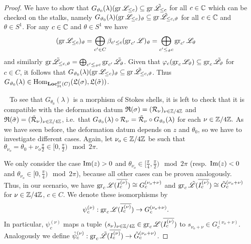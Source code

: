 \begin{proof}
    We have to show that $G_{\vartheta_0}(\lambda)(\operatorname{gr}\mathscr{L}_{\leq c}) \subseteq \operatorname{gr}\tilde{\mathscr{L}}_{\leq c}$ for all $c \in \mathbb{C}$ which can be checked on the stalks, namely $G_{\vartheta_0}(\lambda)(\operatorname{gr}\mathscr{L}_{\leq c})_\vartheta \subseteq \operatorname{gr}\tilde{\mathscr{L}}_{\leq c,\vartheta}$ for all $c \in \mathbb{C}$ and $\theta \in S^1$. For any $c \in \mathbb{C}$ and $\theta \in S^1$ we have
    \[
    (\operatorname{gr}\mathscr{L}_{\leq c})_\vartheta = \bigoplus_{c' \in C} \beta_{c' \leq c}(\operatorname{gr}_{c'}\mathscr{L})_\vartheta = \bigoplus_{c' \leq_\vartheta c} \operatorname{gr}_{c'}\mathscr{L}_\vartheta
    \]
    and similarly $\operatorname{gr}\tilde{\mathscr{L}}_{\leq c,\vartheta} = \bigoplus_{c' \leq_\vartheta c} \operatorname{gr}_{c'}\tilde{\mathscr{L}}_\vartheta$. 
    Given that $\varphi_c(\operatorname{gr}_c\mathscr{L}_{\vartheta}) \subseteq \operatorname{gr}_c\tilde{\mathscr{L}}_{\vartheta}$ for $c \in C$, it follows that $G_{\vartheta_0}(\lambda)(\operatorname{gr}\mathscr{L}_{\leq c})_\vartheta \subseteq \operatorname{gr}\tilde{\mathscr{L}}_{\leq c,\vartheta}$. Thus $G_{\vartheta_0}(\lambda) \in \operatorname{Hom}_{\mathbf{Loc}_{\textrm{St}}^{\operatorname{gr}}(C)}(\mathfrak{L}(\sigma),\mathfrak{L}(\tilde{\sigma}))$.

    ~\newline
    To see that $G_{\theta_0}(\lambda)$ is a morphism of Stokes shells, it is left to check that it is compatible with the deformation datum $\mathfrak{R}(\sigma)=(\mathcal{R}_\nu)_{\nu \in \mathbb{Z}/4\mathbb{Z}}$ and $\mathfrak{R}(\tilde{\sigma})=(\tilde{\mathcal{R}}_\nu)_{\nu \in \mathbb{Z}/4\mathbb{Z}}$, i.e.\ that $G_{\vartheta_0}(\lambda) \circ \mathcal{R}_{\nu} = \tilde{\mathcal{R}}_{\nu} \circ G_{\vartheta_0}(\lambda) $ for each $\nu \in \mathbb{Z}/4\mathbb{Z}.$ As we have seen before, the deformation datum depends on $z$ and $\theta_0$, so we have to investigate different cases. Again, let $\nu_o \in \mathbb{Z}/4\mathbb{Z}$ be such that $\theta_{\nu_o} = \theta_0+\nu_o\frac{\pi}{2} \in [0, \frac{\pi}{2}) \mod 2\pi.$
    
   We only consider the case $\operatorname{Im}(z)>0$ and $\theta_{\nu_o} \in [\frac{\pi}{4},\frac{\pi}{2}) \mod 2\pi$ (resp.\ $\operatorname{Im}(z)<0$ and $\theta_{\nu_o} \in [0,\frac{\pi}{4})\mod 2\pi$), because all other cases can be proven analogously. Thus, in our scenario, we have $\operatorname{gr}_c\mathscr{L}(\overline{I_c^{(\nu)}}) \cong G^{(\nu_o +\nu)}_c$ and $\operatorname{gr}_c\tilde{\mathscr{L}}(\overline{I_c^{(\nu)}}) \cong \tilde{G}^{(\nu_o +\nu)}_c$ for $\nu \in \mathbb{Z}/4\mathbb{Z}$, $c \in C$. 
   We denote these isomorphisms by \[\psi_c^{(\nu)}: \operatorname{gr}_c\mathscr{L}(\overline{I_c^{(\nu)}}) \to G_c^{(\nu_o+\nu)}.\] In particular, $\psi_c^{(\nu)}$ maps a tuple $(s_\nu)_{\nu \in \mathbb{Z}/4\mathbb{Z}} \in \operatorname{gr}_c\mathscr{L}(\overline{I_c^{(\nu)}})$ to $s_{\nu_o+\nu} \in G_c^{(\nu_o+\nu)}$. Analogously we define $\tilde{\psi}_c^{(\nu)}: \operatorname{gr}_c\tilde{\mathscr{L}}(\overline{I_c^{(\nu)}}) \to \tilde{G}_c^{(\nu_o+\nu)}$.


\end{proof}
